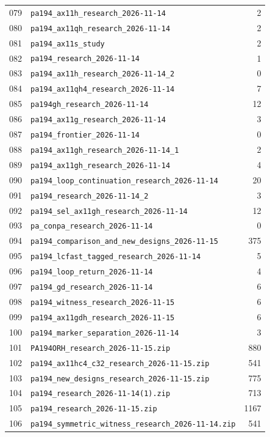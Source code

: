 \begin{longtable}{rL{124mm}r}
079 & \nolinkurl{pa194_ax11h_research_2026-11-14} & 2\\[0.5pt]
080 & \nolinkurl{pa194_ax11qh_research_2026-11-14} & 2\\[0.5pt]
081 & \nolinkurl{pa194_ax11s_study} & 2\\[0.5pt]
082 & \nolinkurl{pa194_research_2026-11-14} & 1\\[0.5pt]
083 & \nolinkurl{pa194_ax11h_research_2026-11-14_2} & 0\\[0.5pt]
084 & \nolinkurl{pa194_ax11qh4_research_2026-11-14} & 7\\[0.5pt]
085 & \nolinkurl{pa194gh_research_2026-11-14} & 12\\[0.5pt]
086 & \nolinkurl{pa194_ax11g_research_2026-11-14} & 3\\[0.5pt]
087 & \nolinkurl{pa194_frontier_2026-11-14} & 0\\[0.5pt]
088 & \nolinkurl{pa194_ax11gh_research_2026-11-14_1} & 2\\[0.5pt]
089 & \nolinkurl{pa194_ax11gh_research_2026-11-14} & 4\\[0.5pt]
090 & \nolinkurl{pa194_loop_continuation_research_2026-11-14} & 20\\[0.5pt]
091 & \nolinkurl{pa194_research_2026-11-14_2} & 3\\[0.5pt]
092 & \nolinkurl{pa194_sel_ax11gh_research_2026-11-14} & 12\\[0.5pt]
093 & \nolinkurl{pa_conpa_research_2026-11-14} & 0\\[0.5pt]
094 & \nolinkurl{pa194_comparison_and_new_designs_2026-11-15} & 375\\[0.5pt]
095 & \nolinkurl{pa194_lcfast_tagged_research_2026-11-14} & 5\\[0.5pt]
096 & \nolinkurl{pa194_loop_return_2026-11-14} & 4\\[0.5pt]
097 & \nolinkurl{pa194_gd_research_2026-11-14} & 6\\[0.5pt]
098 & \nolinkurl{pa194_witness_research_2026-11-15} & 6\\[0.5pt]
099 & \nolinkurl{pa194_ax11gdh_research_2026-11-15} & 6\\[0.5pt]
100 & \nolinkurl{pa194_marker_separation_2026-11-14} & 3\\[0.5pt]
101 & \nolinkurl{PA194ORH_research_2026-11-15.zip} & 880\\[0.5pt]
102 & \nolinkurl{pa194_ax11hc4_c32_research_2026-11-15.zip} & 541\\[0.5pt]
103 & \nolinkurl{pa194_new_designs_research_2026-11-15.zip} & 775\\[0.5pt]
104 & \nolinkurl{pa194_research_2026-11-14(1).zip} & 713\\[0.5pt]
105 & \nolinkurl{pa194_research_2026-11-15.zip} & 1167\\[0.5pt]
106 & \nolinkurl{pa194_symmetric_witness_research_2026-11-14.zip} & 541\\[0.5pt]
\bottomrule
\end{longtable}
\endgroup
